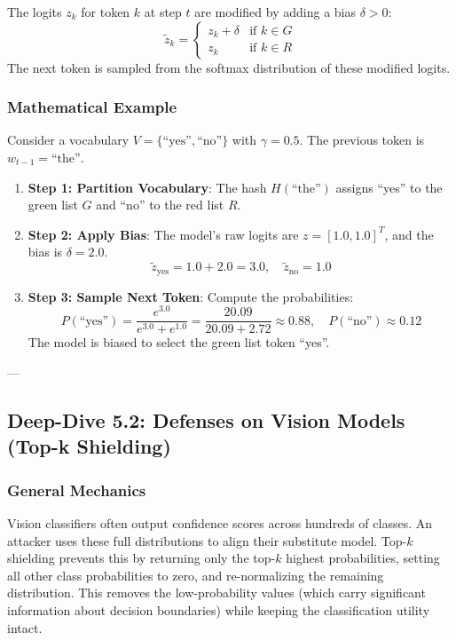 \documentclass{article}
\begin{document}
The logits $z_k$ for token $k$ at step $t$ are modified by adding a bias $\delta > 0$:
\begin{equation}
    \tilde{z}_k = 
    \begin{cases}
        z_k + \delta & \text{if } k \in G \\
        z_k & \text{if } k \in R
    \end{cases}
\end{equation}
The next token is sampled from the softmax distribution of these modified logits.

\subsubsection{Mathematical Example}
Consider a vocabulary $V = \{\text{``yes''}, \text{``no''}\}$ with $\gamma = 0.5$. The previous token is $w_{t-1} = \text{``the''}$.
\begin{enumerate}
    \item \textbf{Step 1: Partition Vocabulary}: The hash $H(\text{``the''})$ assigns ``yes'' to the green list $G$ and ``no'' to the red list $R$.
    \item \textbf{Step 2: Apply Bias}: The model's raw logits are $z = [1.0, 1.0]^T$, and the bias is $\delta = 2.0$.
    $$\tilde{z}_{\text{yes}} = 1.0 + 2.0 = 3.0, \quad \tilde{z}_{\text{no}} = 1.0$$
    
    \item \textbf{Step 3: Sample Next Token}: Compute the probabilities:
    $$P(\text{``yes''}) = \frac{e^{3.0}}{e^{3.0} + e^{1.0}} = \frac{20.09}{20.09 + 2.72} \approx 0.88, \quad P(\text{``no''}) \approx 0.12$$
    The model is biased to select the green list token ``yes''.
\end{enumerate}

---

\subsection{Deep-Dive 5.2: Defenses on Vision Models (Top-k Shielding)}

\subsubsection{General Mechanics}
Vision classifiers often output confidence scores across hundreds of classes. An attacker uses these full distributions to align their substitute model. Top-$k$ shielding prevents this by returning only the top-$k$ highest probabilities, setting all other class probabilities to zero, and re-normalizing the remaining distribution. This removes the low-probability values (which carry significant information about decision boundaries) while keeping the classification utility intact.
\end{document}

